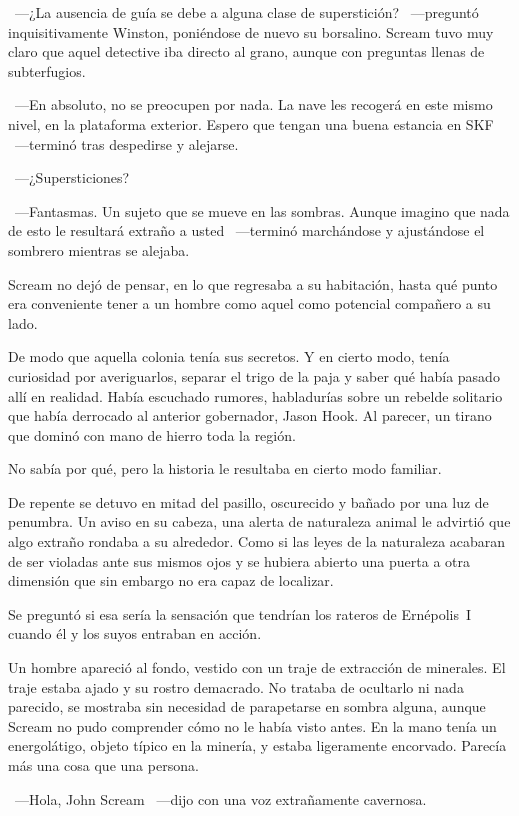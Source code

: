 ~---¿La ausencia de guía se debe a alguna clase de superstición? ~---preguntó inquisitivamente Winston, poniéndose de nuevo su borsalino. Scream tuvo muy claro que aquel detective iba directo al grano, aunque con preguntas llenas de subterfugios.

~---En absoluto, no se preocupen por nada. La nave les recogerá en este mismo nivel, en la plataforma exterior. Espero que tengan una buena estancia en SKF ~---terminó tras despedirse y alejarse.

~---¿Supersticiones?

~---Fantasmas. Un sujeto que se mueve en las sombras. Aunque imagino que nada de esto le resultará extraño a usted ~---terminó marchándose y ajustándose el sombrero mientras se alejaba.

Scream no dejó de pensar, en lo que regresaba a su habitación, hasta qué punto era conveniente tener a un hombre como aquel como potencial compañero a su lado.

De modo que aquella colonia tenía sus secretos. Y en cierto modo, tenía curiosidad por averiguarlos, separar el trigo de la paja y saber qué había pasado allí en realidad. Había escuchado rumores, habladurías sobre un rebelde solitario que había derrocado al anterior gobernador, Jason Hook. Al parecer, un tirano que dominó con mano de hierro toda la región.

No sabía por qué, pero la historia le resultaba en cierto modo familiar.

De repente se detuvo en mitad del pasillo, oscurecido y bañado por una luz de penumbra. Un aviso en su cabeza, una alerta de naturaleza animal le advirtió que algo extraño rondaba a su alrededor. Como si las leyes de la naturaleza acabaran de ser violadas ante sus mismos ojos y se hubiera abierto una puerta a otra dimensión que sin embargo no era capaz de localizar.

Se preguntó si esa sería la sensación que tendrían los rateros de Ernépolis~I cuando él y los suyos entraban en acción.

Un hombre apareció al fondo, vestido con un traje de extracción de minerales. El traje estaba ajado y su rostro demacrado. No trataba de ocultarlo ni nada parecido, se mostraba sin necesidad de parapetarse en sombra alguna, aunque Scream no pudo comprender cómo no le había visto antes. En la mano tenía un energolátigo, objeto típico en la minería, y estaba ligeramente encorvado. Parecía más una cosa que una persona.

~---Hola, John Scream ~---dijo con una voz extrañamente cavernosa.

